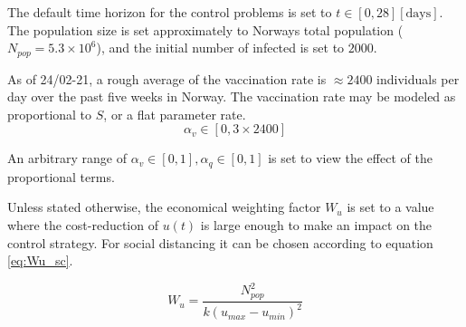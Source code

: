 The default time horizon for the control problems is set to $t \in [0, 28] [\text{days}]$. The population size is set approximately to Norways total population ($N_{pop} = 5.3\times 10^6$), and the initial number of infected is set to $2000$. 

As of 24/02-21, a rough average of the vaccination rate is $\approx 2400$ individuals per day over the past five weeks in Norway. The vaccination rate may be modeled as proportional to $S$, or a flat parameter rate. 
\begin{equation}
    \alpha_v \in [0, 3\times2400]
\end{equation}

An arbitrary range of $\alpha_v \in [0, 1], \alpha_q \in [0, 1]$ is set to view the effect of the proportional terms.

Unless stated otherwise, the economical weighting factor $W_u$ is set to a value where the cost-reduction of $u(t)$ is large enough to make an impact on the control strategy. For social distancing it can be chosen according to equation \ref{eq:Wu_sc}.

\begin{equation}
    W_u = \frac{N_{pop}^2}{k(u_{max}-u_{min})^2}
    \label{eq:Wu_sc}
\end{equation}



